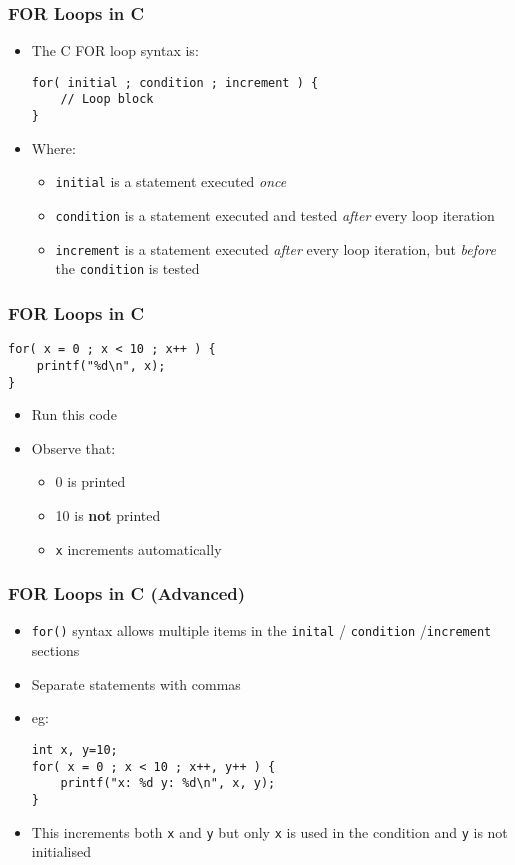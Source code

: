 \documentclass[14pt]{beamer}
\begin{document}
\begin{frame}[fragile]
\frametitle{FOR Loops in C}
\begin{itemize}
\item The C FOR loop syntax is:
\begin{lstlisting}[style=CStyle]
for( initial ; condition ; increment ) {
	// Loop block
}
\end{lstlisting}
\item Where:
	\begin{itemize}
		\item \texttt{initial} is a statement executed \textit{once}
		\item \texttt{condition} is a statement executed and tested \textit{after} every loop iteration
		\item \texttt{increment} is a statement executed \textit{after} every loop iteration, but \textit{before} the \texttt{condition} is tested
	\end{itemize}
\end{itemize}
\end{frame}

\begin{frame}[fragile]
\frametitle{FOR Loops in C}
\begin{lstlisting}[style=CStyle]
for( x = 0 ; x < 10 ; x++ ) {
	printf("%d\n", x);
}
\end{lstlisting}
\begin{itemize}
\item Run this code
\item Observe that:
	\begin{itemize}
		\item 0 is printed
		\item 10 is \textbf{not} printed
		\item \texttt{x} increments automatically
	\end{itemize}

\end{itemize}
\end{frame}

\begin{frame}[fragile]
\frametitle{FOR Loops in C (Advanced)}
\begin{itemize}
\item \texttt{for()} syntax allows multiple items in the \texttt{inital} / \texttt{condition} /\texttt{increment} sections
\item Separate statements with commas
\item eg:
\begin{lstlisting}[style=CStyle]
int x, y=10;
for( x = 0 ; x < 10 ; x++, y++ ) {
	printf("x: %d y: %d\n", x, y);
}
\end{lstlisting}
\item This increments both \texttt{x} and \texttt{y} but only \texttt{x} is used in the condition and \texttt{y} is not initialised
\end{itemize}
\end{frame}
\end{document}
